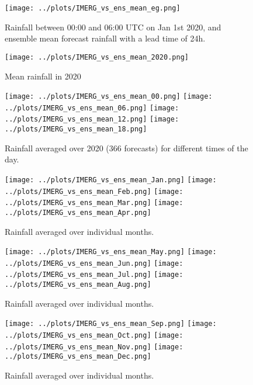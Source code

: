 \documentclass[12pt]{article}
\begin{document}

\begin{figure}
\begin{center}
\texttt{[image: ../plots/IMERG\_vs\_ens\_mean\_eg.png]}
\end{center}
\caption{Rainfall between 00:00 and 06:00 UTC on Jan 1st 2020, and ensemble mean forecast rainfall with a lead time of 24h.}
\end{figure}

\begin{figure}
\begin{center}
\texttt{[image: ../plots/IMERG\_vs\_ens\_mean\_2020.png]}
\end{center}
\caption{Mean rainfall in 2020}
\end{figure}

\begin{figure}
\begin{center}
\texttt{[image: ../plots/IMERG\_vs\_ens\_mean\_00.png]}
\texttt{[image: ../plots/IMERG\_vs\_ens\_mean\_06.png]}
\texttt{[image: ../plots/IMERG\_vs\_ens\_mean\_12.png]}
\texttt{[image: ../plots/IMERG\_vs\_ens\_mean\_18.png]}
\end{center}
\caption{Rainfall averaged over 2020 (366 forecasts) for different times of the day.}
\end{figure}

\begin{figure}
\begin{center}
\texttt{[image: ../plots/IMERG\_vs\_ens\_mean\_Jan.png]}
\texttt{[image: ../plots/IMERG\_vs\_ens\_mean\_Feb.png]}
\texttt{[image: ../plots/IMERG\_vs\_ens\_mean\_Mar.png]}
\texttt{[image: ../plots/IMERG\_vs\_ens\_mean\_Apr.png]}
\end{center}
\caption{Rainfall averaged over individual months.}
\end{figure}

\begin{figure}
\begin{center}
\texttt{[image: ../plots/IMERG\_vs\_ens\_mean\_May.png]}
\texttt{[image: ../plots/IMERG\_vs\_ens\_mean\_Jun.png]}
\texttt{[image: ../plots/IMERG\_vs\_ens\_mean\_Jul.png]}
\texttt{[image: ../plots/IMERG\_vs\_ens\_mean\_Aug.png]}
\end{center}
\caption{Rainfall averaged over individual months.}
\end{figure}

\begin{figure}
\begin{center}
\texttt{[image: ../plots/IMERG\_vs\_ens\_mean\_Sep.png]}
\texttt{[image: ../plots/IMERG\_vs\_ens\_mean\_Oct.png]}
\texttt{[image: ../plots/IMERG\_vs\_ens\_mean\_Nov.png]}
\texttt{[image: ../plots/IMERG\_vs\_ens\_mean\_Dec.png]}
\end{center}
\caption{Rainfall averaged over individual months.}
\end{figure}
\end{document}
